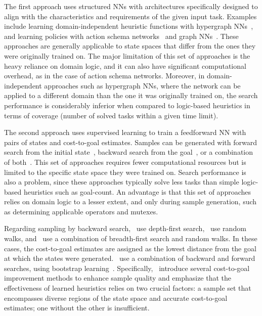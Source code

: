 \documentclass[ppgc,diss,english]{iiufrgs}
\begin{document}
The first approach uses structured NNs with architectures specifically designed to align with the characteristics and requirements of the given input task. Examples include learning domain-independent heuristic functions with hypergraph NNs~\cite{Shen.etal/2020}, and learning policies with action schema networks~\cite{Toyer.etal/2018,Toyer.etal/2020} and graph NNs~\cite{Stahlberg.etal/2022}. These approaches are generally applicable to state spaces that differ from the ones they were originally trained on. The major limitation of this set of approaches is the heavy reliance on domain logic, and it can also have significant computational overhead, as in the case of action schema networks. Moreover, in domain-independent approaches such as hypergraph NNs, where the network can be applied to a different domain than the one it was originally trained on, the search performance is considerably inferior when compared to logic-based heuristics in terms of coverage (number of solved tasks within a given time limit).

The second approach uses supervised learning to train a feedforward NN with pairs of states and cost-to-goal estimates. Samples can be generated with forward search from the initial state~\cite{Ferber.etal/2020a}, backward search from the goal~\cite{Yu.etal/2020,OToole/2022,Bettker.etal/2022}, or a combination of both~\cite{Ferber.etal/2022}.
This set of approaches requires fewer computational resources but is limited to the specific state space they were trained on. Search performance is also a problem, since these approaches typically solve less tasks than simple logic-based heuristics such as goal-count. An advantage is that this set of approaches relies on domain logic to a lesser extent, and only during sample generation, such as determining applicable operators and mutexes.

Regarding sampling by backward search,~\citet{Yu.etal/2020} use depth-first search,~\citet{OToole/2022} use random walks, and~\citet{Bettker.etal/2022} use a combination of breadth-first search and random walks. In these cases, the cost-to-goal estimates are assigned as the lowest distance from the goal at which the states were generated.~\citet{Ferber.etal/2022} use a combination of backward and forward searches, using bootstrap learning~\cite{Arfaee.etal/2011}.
Specifically,~\citet{Bettker.etal/2022} introduce several cost-to-goal improvement methods to enhance sample quality and emphasize that the effectiveness of learned heuristics relies on two crucial factors: a sample set that encompasses diverse regions of the state space and accurate cost-to-goal estimates; one without the other is insufficient.
\end{document}
